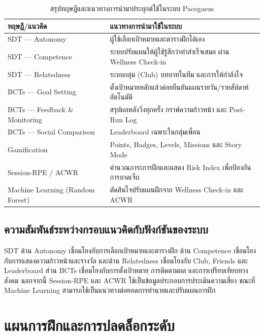 \begin{table}[H]
\centering
\small
\renewcommand{\arraystretch}{1.45}
\caption{สรุปทฤษฎีและแนวทางการนำมาประยุกต์ใช้ในระบบ Pacegasus}
\label{tab:theory-application}
\begin{tabular}{|p{}|p{}|}
\hline
\textbf{ทฤษฎี/แนวคิด} & \textbf{แนวทางการนำมาใช้ในระบบ} \\
\hline
SDT --- Autonomy & ผู้ใช้เลือกเป้าหมายและตารางฝึกได้เอง \\
\hline
SDT --- Competence & ระบบปรับแผนให้ผู้ใช้รู้สึกว่าทำสำเร็จเสมอ ผ่าน Wellness Check-in \\
\hline
SDT --- Relatedness & ระบบกลุ่ม (Club) บทบาทในทีม และการให้กำลังใจ \\
\hline
BCTs --- Goal Setting & ตั้งเป้าหมายหลักแล้วค่อยยืนยันแผนรายวัน/รายสัปดาห์อัตโนมัติ \\
\hline
BCTs --- Feedback \& Monitoring & สรุปผลหลังวิ่งทุกครั้ง กราฟความก้าวหน้า และ Post-Run Log \\
\hline
BCTs --- Social Comparison & Leaderboard เฉพาะในกลุ่มเพื่อน \\
\hline
Gamification & Points, Badges, Levels, Missions และ Story Mode \\
\hline
Session-RPE / ACWR & คำนวณภาระการฝึกและแสดง Risk Index เพื่อป้องกันการบาดเจ็บ \\
\hline
Machine Learning (Random Forest) & ตัดสินใจปรับแผนฝึกจาก Wellness Check-in และ ACWR \\
\hline
\end{tabular}
\end{table}

\subsection{ความสัมพันธ์ระหว่างกรอบแนวคิดกับฟังก์ชันของระบบ}

SDT ด้าน Autonomy เชื่อมโยงกับการเลือกเป้าหมายและตารางฝึก ด้าน Competence เชื่อมโยงกับการแสดงความก้าวหน้าและรางวัล และด้าน Relatedness เชื่อมโยงกับ Club, Friends และ Leaderboard ส่วน BCTs เชื่อมโยงกับการตั้งเป้าหมาย การติดตามผล และการเปรียบเทียบทางสังคม นอกจากนี้ Session-RPE และ ACWR ใช้เป็นข้อมูลประกอบการประเมินความเสี่ยง ขณะที่ Machine Learning สามารถใช้เป็นแนวทางต่อยอดการทำนายและปรับแผนการฝึก

\section{แผนการฝึกและการปลดล็อกระดับ}

